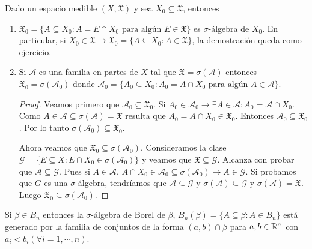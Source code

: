 \clearpage

\begin{prop}
    Dado un espacio medible $(X, \mathfrak{X})$ y sea $X_0 \subseteq \mathfrak{X}$, entonces
    \begin{enumerate}
        \item $\mathfrak{X}_0 = \{ A \subseteq X_0 : A = E \cap X_0 \text{ para algún } E \in \mathfrak{X} \}$ es $\sigma$-álgebra de $X_0$. En particular,
        si $X_0 \in \mathfrak{X} \to \mathfrak{X}_0 = \{ A \subseteq X_0 : A \in \mathfrak{X} \}$, la demostración queda como ejercicio.
        \item Si $\mathcal{A}$ es una familia en partes de $X$ tal que $\mathfrak{X} = \sigma(\mathcal{A})$ entonces $\mathfrak{X}_0 = \sigma(\mathcal{A}_0)$ donde
        $\mathcal{A}_0 = \{ A_0 \subseteq X_0 : A_0 = A \cap X_0 \text{ para algún } A \in \mathcal{A} \}$.
        \begin{proof}
            Veamos primero que $\mathcal{A}_0 \subseteq \mathfrak{X}_0$. Si $A_0 \in \mathcal{A}_0 \to \exists A \in \mathcal{A} : A_0 = \mathcal{A} \cap X_0$.
            Como $A \in \mathcal{A} \subseteq \sigma(\mathcal{A}) = \mathfrak{X}$ resulta que $A_0 = A \cap X_0 \in \mathfrak{X}_0$.
            Entonces $\mathcal{A}_0 \subseteq \mathfrak{X}_0$. Por lo tanto $\sigma(\mathcal{A}_0) \subseteq \mathfrak{X}_0$.
            
            Ahora veamos que $\mathfrak{X}_0 \subseteq \sigma(\mathcal{A}_0)$.
            Consideramos la clase $\mathcal{G} = \{ E \subseteq X : E \cap X_0 \in \sigma(\mathcal{A}_0) \}$ y veamos que $\mathfrak{X} \subseteq \mathcal{G}$.
            Alcanza con probar que $\mathcal{A} \subseteq \mathcal{G}$. Pues si $A \in \mathcal{A}$, $A \cap X_0 \in \mathcal{A}_0 \subseteq \sigma(\mathcal{A}_0) \to A \in \mathcal{G}$.
            Si probamos que $G$ es una $\sigma$-álgebra, tendríamos que $\mathcal{A} \subseteq \mathcal{G}$ y $\sigma(\mathcal{A}) \subseteq \mathcal{G}$ y $\sigma(\mathcal{A}) = \mathfrak{X}$.
            Luego $\mathfrak{X}_0 \subseteq \sigma(\mathcal{A}_0)$.
        \end{proof}
    \end{enumerate}
\end{prop}

\begin{eg}
    Si $\beta \in B_n$ entonces la $\sigma$-álgebra de Borel de $\beta$, $B_n(\beta) = \{ A \subseteq \beta : A \in B_n \}$ está generado por la familia de conjuntos
    de la forma $(a, b) \cap \beta$ para $a, b \in \mathbb{R}^n$ con $a_i < b_i (\forall i = 1, \cdots, n)$.
\end{eg}

